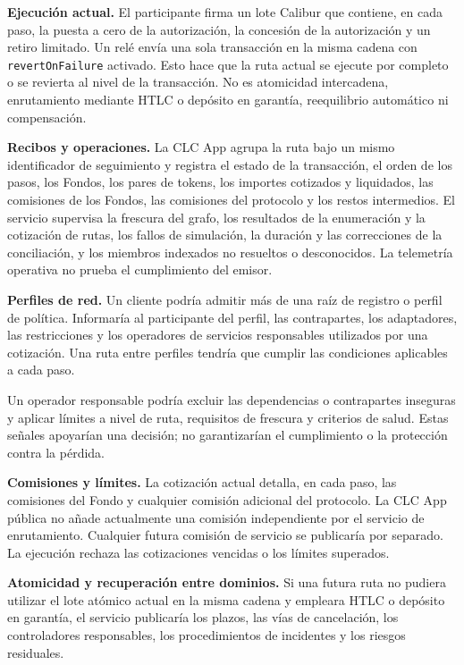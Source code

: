 \documentclass[11pt]{article}
\begin{document}
\textbf{Ejecución actual.} El participante firma un lote Calibur que contiene, en cada paso, la puesta a cero de la autorización, la concesión de la autorización y un retiro limitado. Un relé envía una sola transacción en la misma cadena con \texttt{revertOnFailure} activado. Esto hace que la ruta actual se ejecute por completo o se revierta al nivel de la transacción. No es atomicidad intercadena, enrutamiento mediante HTLC o depósito en garantía, reequilibrio automático ni compensación.

\textbf{Recibos y operaciones.} La CLC App agrupa la ruta bajo un mismo identificador de seguimiento y registra el estado de la transacción, el orden de los pasos, los Fondos, los pares de tokens, los importes cotizados y liquidados, las comisiones de los Fondos, las comisiones del protocolo y los restos intermedios. El servicio supervisa la frescura del grafo, los resultados de la enumeración y la cotización de rutas, los fallos de simulación, la duración y las correcciones de la conciliación, y los miembros indexados no resueltos o desconocidos. La telemetría operativa no prueba el cumplimiento del emisor.

\textbf{Perfiles de red.} Un cliente podría admitir más de una raíz de registro o perfil de política. Informaría al participante del perfil, las contrapartes, los adaptadores, las restricciones y los operadores de servicios responsables utilizados por una cotización. Una ruta entre perfiles tendría que cumplir las condiciones aplicables a cada paso.

Un operador responsable podría excluir las dependencias o contrapartes inseguras y aplicar límites a nivel de ruta, requisitos de frescura y criterios de salud. Estas señales apoyarían una decisión; no garantizarían el cumplimiento o la protección contra la pérdida.

\textbf{Comisiones y límites.} La cotización actual detalla, en cada paso, las comisiones del Fondo y cualquier comisión adicional del protocolo. La CLC App pública no añade actualmente una comisión independiente por el servicio de enrutamiento. Cualquier futura comisión de servicio se publicaría por separado. La ejecución rechaza las cotizaciones vencidas o los límites superados.

\textbf{Atomicidad y recuperación entre dominios.} Si una futura ruta no pudiera utilizar el lote atómico actual en la misma cadena y empleara HTLC o depósito en garantía, el servicio publicaría los plazos, las vías de cancelación, los controladores responsables, los procedimientos de incidentes y los riesgos residuales.
\end{document}
